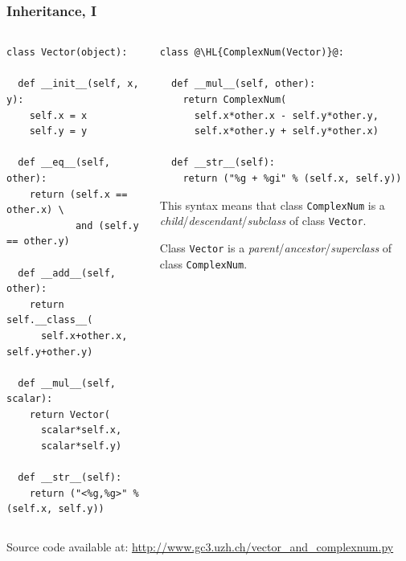 \documentclass[english,serif,mathserif,xcolor=pdftex,dvipsnames,table]{beamer}
\begin{document}
\begin{frame}[fragile]
  \frametitle{Inheritance, I}

  \begin{columns}[t]
    \begin{column}{0.5\textwidth}
\begin{lstlisting}[basicstyle=\tiny\ttfamily,showstringspaces=false]
class Vector(object):

  def __init__(self, x, y):
    self.x = x
    self.y = y

  def __eq__(self, other):
    return (self.x == other.x) \
            and (self.y == other.y)

  def __add__(self, other):
    return self.__class__(
      self.x+other.x, self.y+other.y)

  def __mul__(self, scalar):
    return Vector(
      scalar*self.x,
      scalar*self.y)

  def __str__(self):
    return ("<%g,%g>" % (self.x, self.y))
\end{lstlisting}
    \end{column}
    \begin{column}{0.5\textwidth}
\begin{lstlisting}[basicstyle=\tiny\ttfamily,showstringspaces=false]
class @\HL{ComplexNum(Vector)}@:

  def __mul__(self, other):
    return ComplexNum(
      self.x*other.x - self.y*other.y,
      self.x*other.y + self.y*other.x)

  def __str__(self):
    return ("%g + %gi" % (self.x, self.y))
\end{lstlisting}

      \+
      This syntax means that class \texttt{ComplexNum} is a
      \emph{child}/\emph{descendant}/\emph{subclass} of class \texttt{Vector}.

      \+
      Class \texttt{Vector} is a
      \emph{parent}/\emph{ancestor}/\emph{superclass} of class
      \texttt{ComplexNum}.
    \end{column}
  \end{columns}

  \+
  {\scriptsize Source code available at:
    \url{http://www.gc3.uzh.ch/vector_and_complexnum.py}}
\end{frame}
\end{document}
